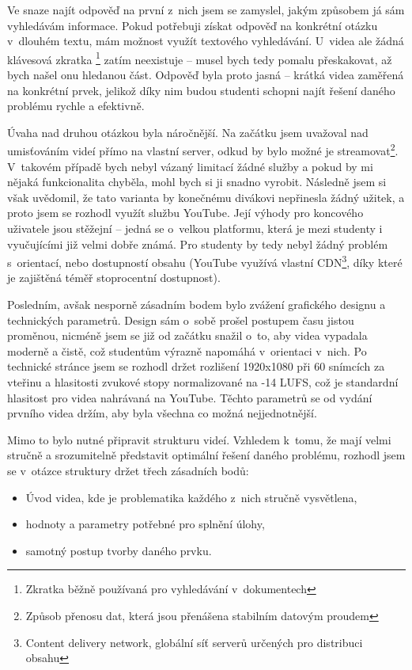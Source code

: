 Ve snaze najít odpověď na první z~nich jsem se zamyslel, jakým způsobem já sám vyhledávám informace.
Pokud potřebuji získat odpověď na konkrétní otázku v~dlouhém textu, mám možnost využít textového vyhledávání. 
U~videa ale žádná klávesová zkratka \footnote{Zkratka běžně používaná pro vyhledávání v~dokumentech} zatím neexistuje -- musel bych tedy pomalu přeskakovat, až bych našel onu hledanou část.
Odpověď byla proto jasná -- krátká videa zaměřená na konkrétní prvek, jelikož díky nim budou studenti schopni najít řešení daného problému rychle a efektivně.

Úvaha nad druhou otázkou byla náročnější.
Na začátku jsem uvažoval nad umisťováním videí přímo na vlastní server, odkud by bylo možné je streamovat\footnote{Způsob přenosu dat, která jsou přenášena stabilním datovým proudem}.
V~takovém případě bych nebyl vázaný limitací žádné služby a pokud by mi nějaká funkcionalita chyběla, mohl bych si ji snadno vyrobit.
Následně jsem si však uvědomil, že tato varianta by konečnému divákovi nepřinesla žádný užitek, a proto jsem se rozhodl využít službu YouTube.
Její výhody pro koncového uživatele jsou stěžejní -- jedná se o~velkou platformu, která je mezi studenty i vyučujícími již velmi dobře známá.
Pro studenty by tedy nebyl žádný problém s~orientací, nebo dostupností obsahu (YouTube využívá vlastní CDN\footnote{Content delivery network, globální síť serverů určených pro distribuci obsahu}, díky které je zajištěná téměř stoprocentní dostupnost).

Posledním, avšak nesporně zásadním bodem bylo zvážení grafického designu a technických parametrů.
Design sám o~sobě prošel postupem času jistou proměnou, nicméně jsem se již od začátku snažil o~to, aby videa vypadala moderně a čistě, což studentům výrazně napomáhá v~orientaci v~nich.
Po technické stránce jsem se rozhodl držet rozlišení 1920x1080 při 60 snímcích za vteřinu a hlasitosti zvukové stopy normalizované na -14 LUFS, což je standardní hlasitost pro videa nahrávaná na YouTube.
Těchto parametrů se od vydání prvního videa držím, aby byla všechna co možná nejjednotnější.

Mimo to bylo nutné připravit strukturu videí.
Vzhledem k~tomu, že mají velmi stručně a srozumitelně představit optimální řešení daného problému, rozhodl jsem se v~otázce struktury držet třech zásadních bodů:
\begin{itemize}[topsep=0pt]
    \setlength\itemsep{0em}
    \item Úvod videa, kde je problematika každého z~nich stručně vysvětlena,
    \item hodnoty a parametry potřebné pro splnění úlohy,
    \item samotný postup tvorby daného prvku.
\end{itemize}

